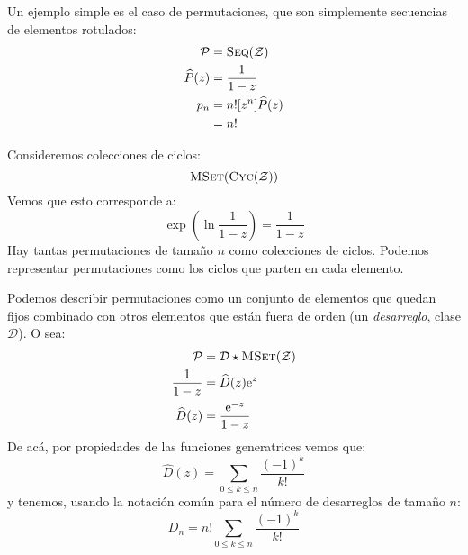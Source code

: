 \documentclass[english, spanish, fleqn, 10pt]{article}
\numberwithin{equation}{section}
\theoremstyle{definition}
\DeclareMathOperator{\Seq}{\textsc{Seq}}
\DeclareMathOperator{\Cyc}{\textsc{Cyc}}
\DeclareMathOperator{\MSet}{\textsc{MSet}}
\begin{document}
Un ejemplo simple es el caso de permutaciones,
que son simplemente secuencias de elementos rotulados:
\begin{align*}
	\mathcal{P}
	&= \Seq(\mathcal{Z}) \\
	\widehat{P}(z)
	&= \frac{1}{1 - z} \\
	p_n
	&= n! [z^n] \widehat{P}(z) \\
	&= n!
\end{align*}
	
Consideremos colecciones de ciclos:
\begin{equation*}
	\MSet(\Cyc(\mathcal{Z}))
\end{equation*}
Vemos que esto corresponde a:
\begin{equation*}
	\exp\left( \ln \frac{1}{1 - z} \right)
	= \frac{1}{1 - z}
\end{equation*}
Hay tantas permutaciones de tamaño \(n\) como colecciones de ciclos.
Podemos representar permutaciones
como los ciclos que parten en cada elemento.
	
Podemos describir permutaciones
como un conjunto de elementos que quedan fijos
combinado con otros elementos que están fuera de orden
	(un \emph{desarreglo},
	clase \(\mathcal{D}\)).
	O sea:
	\begin{align*}
	\mathcal{P}
	&= \mathcal{D} \star \MSet(\mathcal{Z}) \\
	\frac{1}{1 - z}
	&= \widehat{D}(z) \mathrm{e}^z \\
	\widehat{D}(z)
	&= \frac{\mathrm{e}^{-z}}{1 - z}
	\end{align*}
	De acá,
	por propiedades de las funciones generatrices vemos que:
	\begin{equation*}
	[z^n] \widehat{D}(z)
	= \sum_{0 \le k \le n} \frac{(-1)^k}{k!}
	\end{equation*}
	y tenemos,
	usando la notación común para el número de desarreglos de tamaño \(n\):
	\begin{equation*}
	D_n
	= n! \sum_{0 \le k \le n} \frac{(-1)^k}{k!}
	\end{equation*}
	
\end{document}
